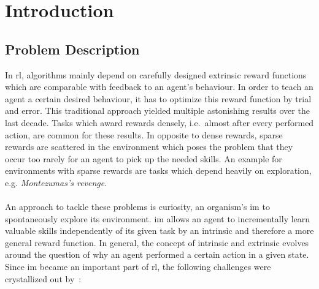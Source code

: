 \documentclass[draft,final]{vutinfth} %
\newcommand{\p}[1]{see p. #1}
\begin{document}
    \begin{kurzfassung}
    \end{kurzfassung}

    \begin{abstract}
    \end{abstract}


    \tableofcontents %

    \mainmatter


    \chapter{Introduction}


    \section{Problem Description}\label{sec:problem-description}
    In \gls{rl}, algorithms mainly depend on carefully designed extrinsic reward functions which are comparable with feedback to an agent's behaviour.
    In order to teach an agent a certain desired behaviour, it has to optimize this reward function by trial and error.
    This traditional approach yielded multiple astonishing results over the last decade.
    Tasks which award rewards densely, i.e.\ almost after every performed action, are common for these results.
    In opposite to dense rewards, sparse rewards are scattered in the environment which poses the problem that they occur too rarely for an agent to pick up the needed skills.
    An example for environments with sparse rewards are tasks which depend heavily on exploration, e.g. \textit{Montezumas's revenge}.
    \\\\
    An approach to tackle these problems is curiosity, an organism's \gls{im} to spontaneously explore its environment.
    \gls{im} allows an agent to incrementally learn valuable skills independently of its given task by an intrinsic and therefore a more general reward function.
    In general, the concept of intrinsic and extrinsic evolves around the question of why an agent performed a certain action in a given state.
    Since \gls{im} became an important part of \gls{rl}, the following challenges were crystallized out by~\cite[\p{6}]{aubret_survey_2019}:
\end{document}
